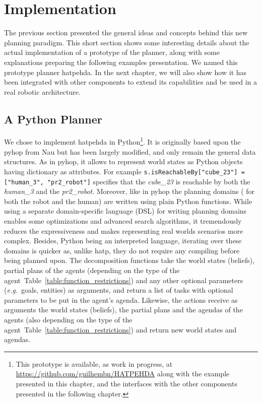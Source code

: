 \documentclass[a4paper,11pt,twoside]{StyleThese}
\begin{document}
\section{Implementation}
The previous section presented the general ideas and concepts behind this new planning paradigm. This short section shows some interesting details about the actual implementation of a prototype of the planner, along with some explanations preparing the following examples presentation. We named this prototype planner \acrfull{hatpehda}. In the next chapter, we will also show how it has been integrated with other components to extend its capabilities and be used in a real robotic architecture.

\subsection{A Python Planner}
We chose to implement \acrshort{hatpehda} in Python\footnote{This prototype is available, as work in progress, at \url{https://github.com/guilhembn/HATPEHDA} along with the example presented in this chapter, and the interfaces with the other components presented in the following chapter.}. It is originally based upon the \acrfull{pyhop} from Nau but has been largely modified, and only remain the general data structures. As in \acrshort{pyhop}, it allows to represent world states as Python objects having dictionary as attributes. For example \verb|s.isReachableBy["cube_23"] = ["human_3", "pr2_robot"]| specifies that the \textit{cube\_23} is reachable by both the \textit{human\_3} and the \textit{pr2\_robot}. 
Moreover, like in \acrshort{pyhop} the planning domains ( for both the robot and the human) are written using plain Python functions. While using a separate domain-specific language (DSL) for writing planning domains enables some optimizations and advanced search algorithms, it tremendously reduces the expressiveness and makes representing real worlds scenarios more complex. Besides, Python being an interpreted language, iterating over these domains is quicker as, unlike \acrshort{hatp}, they do not require any compiling before being planned upon.
The decomposition functions take the world states (beliefs), partial plans of the agents (depending on the type of the agent~Table~\ref{table:function_restrictions}) and any other optional parameters (\textit{e.g.}~goals, entities) as arguments, and return a list of tasks with optional parameters to be put in the agent's agenda. Likewise, the actions receive as arguments the world states (beliefs), the partial plans and the agendas of the agents (also depending on the type of the agent~Table~\ref{table:function_restrictions}) and return new world states and agendas.
\end{document}
